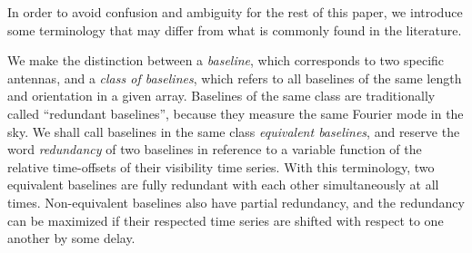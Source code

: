 \documentclass[twocolumn,apj,numberedappendix]{emulateapj}
\renewcommand\[{\begin{equation}}
\renewcommand\]{\end{equation}}
\begin{document}
In order to avoid confusion and ambiguity for the rest of this paper, we
introduce some terminology that may differ from what is commonly found in the literature. 

We make the distinction between a \textit{baseline}, which corresponds to two specific antennas, and a \textit{class of baselines}, which refers to all baselines of the same length and orientation in a given array. 
Baselines of the same class are traditionally called
``redundant baselines'', because they measure the same Fourier mode
in the sky.  We shall call baselines in the same class \textit{equivalent baselines}, and reserve the word \textit{redundancy} of two baselines in reference to a variable function of the relative time-offsets of their visibility time series. With this terminology, two equivalent
baselines are fully redundant with each other simultaneously at all
times. Non-equivalent baselines also have partial redundancy, and the redundancy can be maximized if their
respected time series are shifted with respect to one another by some delay. 
\end{document}
